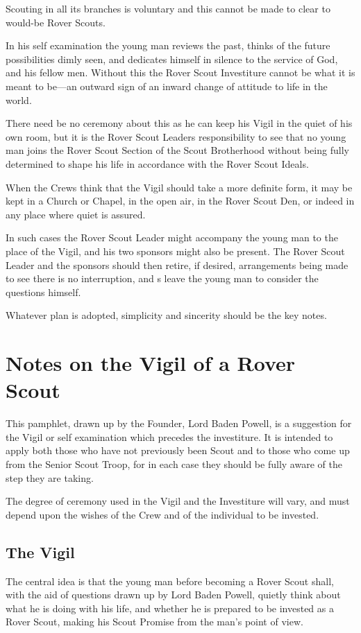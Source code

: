 \documentclass[11pt]{article}
\begin{document}
Scouting in all its branches is voluntary and this cannot be made to clear to would-be Rover Scouts.

In his self examination the young man reviews the past, thinks of the future possibilities dimly seen, and dedicates himself in silence to the service of God, and his fellow men. Without this the Rover Scout Investiture cannot be what it is meant to be---an outward sign of an inward change of attitude to life in the world.

There need be no ceremony about this as he can keep his Vigil in the quiet of his own room, but it is the Rover Scout Leaders responsibility to see that no young man joins the Rover Scout Section of the Scout Brotherhood without being fully determined to shape his life in accordance with the Rover Scout Ideals.

When the Crews think that the Vigil should take a more definite form, it may be kept in a Church or Chapel, in the open air, in the Rover Scout Den, or indeed in any place where quiet is assured.

In such cases the Rover Scout Leader might accompany the young man to the place of the Vigil, and his two sponsors might also be present. The Rover Scout Leader and the sponsors should then retire, if desired, arrangements being made to see there is no interruption, and s leave the young man to consider the questions himself.

Whatever plan is adopted, simplicity and sincerity should be the key notes.


\section{Notes on the Vigil of a Rover Scout}
This pamphlet, drawn up by the Founder, Lord Baden Powell, is a suggestion for the Vigil or self examination which precedes the investiture. It is intended to apply both those who have not previously been Scout and to those who come up from the Senior Scout Troop, for in each case they should be fully aware of the step they are taking.

The degree of ceremony used in the Vigil and the Investiture will vary, and must depend upon the wishes of the Crew and of the individual to be invested.

\subsection{The Vigil}
The central idea is that the young man before becoming a Rover Scout shall, with the aid of questions drawn up by Lord Baden Powell, quietly think about what he is doing with his life, and whether he is prepared to be invested as a Rover Scout, making his Scout Promise from the man's point of view.
\end{document}
